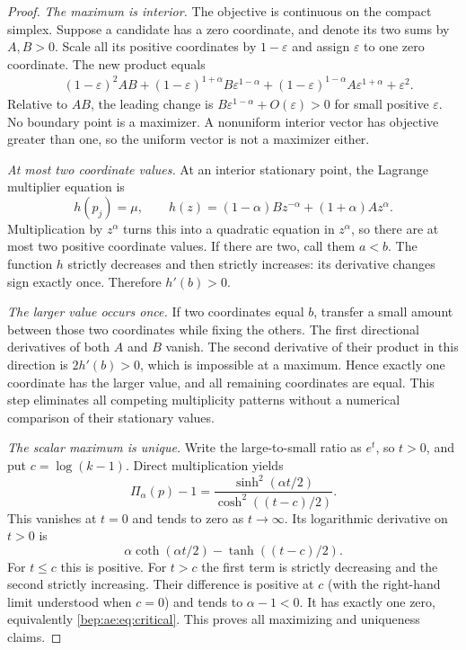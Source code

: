 \documentclass[11pt]{article}
\numberwithin{equation}{section}
\theoremstyle{definition}
\theoremstyle{remark}
\begin{document}
\begin{proof}
\emph{The maximum is interior.}
The objective is continuous on the compact simplex. Suppose a candidate
has a zero coordinate, and denote its two sums by $A,B>0$. Scale all its
positive coordinates by $1-\varepsilon$ and assign $\varepsilon$ to one
zero coordinate. The new product equals
\begin{align*}
 &(1-\varepsilon)^2 AB
 +(1-\varepsilon)^{1+\alpha}B\varepsilon^{1-\alpha}
 +(1-\varepsilon)^{1-\alpha}A\varepsilon^{1+\alpha}
 +\varepsilon^2.
\end{align*}
Relative to $AB$, the leading change is
$B\varepsilon^{1-\alpha}+O(\varepsilon)>0$ for small positive
$\varepsilon$. No boundary point is a maximizer. A nonuniform interior
vector has objective greater than one, so the uniform vector is not a
maximizer either.

\emph{At most two coordinate values.}
At an interior stationary point, the Lagrange multiplier equation is
\begin{equation}\label{bep:ae:eq:stationary}
 h(p_j)=\mu,\qquad
 h(z)=(1-\alpha)Bz^{-\alpha}+(1+\alpha)Az^\alpha.
\end{equation}
Multiplication by $z^\alpha$ turns this into a quadratic equation in
$z^\alpha$, so there are at most two positive coordinate values. If there
are two, call them $a<b$. The function $h$ strictly decreases and then
strictly increases: its derivative changes sign exactly once. Therefore
$h'(b)>0$.

\emph{The larger value occurs once.}
If two coordinates equal $b$, transfer a small amount between those two
coordinates while fixing the others. The first directional derivatives
of both $A$ and $B$ vanish. The second derivative of their product in this
direction is $2h'(b)>0$, which is impossible at a maximum. Hence exactly
one coordinate has the larger value, and all remaining coordinates are
equal. This step eliminates all competing multiplicity patterns without
a numerical comparison of their stationary values.

\emph{The scalar maximum is unique.}
Write the large-to-small ratio as $e^t$, so $t>0$, and put
$c=\log(k-1)$. Direct multiplication yields
\[
 \Pi_\alpha(p)-1
 =\frac{\sinh^2(\alpha t/2)}{\cosh^2((t-c)/2)}.
\]
This vanishes at $t=0$ and tends to zero as $t\to\infty$. Its logarithmic
derivative on $t>0$ is
\begin{equation}\label{bep:ae:eq:logderivative}
 \alpha\coth(\alpha t/2)-\tanh((t-c)/2).
\end{equation}
For $t\leq c$ this is positive. For $t>c$ the first term is strictly
decreasing and the second strictly increasing. Their difference is
positive at $c$ (with the right-hand limit understood when $c=0$) and
tends to $\alpha-1<0$. It has exactly one zero, equivalently
\eqref{bep:ae:eq:critical}. This proves all maximizing and uniqueness claims.


\end{proof}
\end{document}
